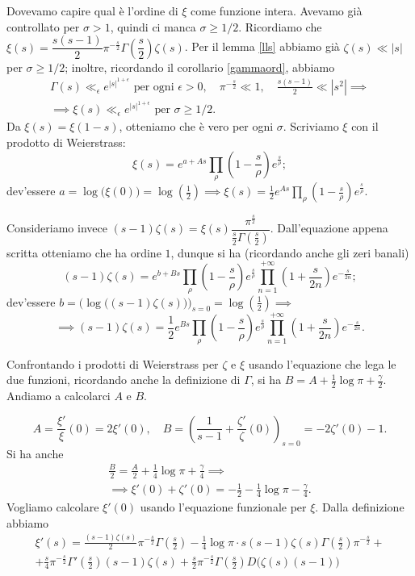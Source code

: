 Dovevamo capire qual è l'ordine di $\xi$ come funzione intera. Avevamo già controllato per $\sigma>1$, quindi ci manca $\sigma \ge 1/2$. Ricordiamo che $\xi(s)=\dfrac{s(s-1)}{2}\pi^{-\frac{s}{2}}\Gamma\left(\dfrac{s}{2}\right)\zeta(s)$. Per il lemma \ref{lls} abbiamo già $\zeta(s) \ll |s|$ per $\sigma \ge 1/2$; inoltre, ricordando il corollario \ref{gammaord}, abbiamo
\begin{gather*}
  \Gamma(s) \ll_{\epsilon} e^{|s|^{1+\epsilon}} \text{ per ogni } \epsilon>0, \quad \pi^{-\frac{s}{2}} \ll 1, \quad \frac{s(s-1)}{2} \ll |s^2| \implies \\
  \implies \xi(s) \ll_{\epsilon} e^{|s|^{1+\epsilon}} \text{ per }\sigma \ge 1/2.
\end{gather*}
Da $\xi(s)=\xi(1-s)$, otteniamo che è vero per ogni $\sigma$. Scriviamo $\xi$ con il prodotto di Weierstrass:
$$\xi(s)=e^{a+As}\prod_{\rho}\left(1-\frac{s}{\rho}\right)e^{\frac{s}{\rho}};$$
dev'essere $\displaystyle a=\log\big(\xi(0)\big)=\log\left(\frac{1}{2}\right) \implies \xi(s)=\frac{1}{2}e^{As}\prod_{\rho}\left(1-\frac{s}{\rho}\right)e^{\frac{s}{\rho}}$.

Consideriamo invece $(s-1)\zeta(s)=\xi(s)\dfrac{\pi^{\frac{s}{2}}}{\frac{s}{2}\Gamma\left(\frac{s}{2}\right)}$. Dall'equazione appena scritta otteniamo che ha ordine $1$, dunque si ha (ricordando anche gli zeri banali)
$$(s-1)\zeta(s)=e^{b+Bs}\prod_{\rho}\left(1-\frac{s}{\rho}\right)e^{\frac{s}{\rho}}\prod_{n=1}^{+\infty}\left(1+\frac{s}{2n}\right)e^{-\frac{s}{2n}};$$
dev'essere $\displaystyle b=\Bigg(\log\big((s-1)\zeta(s)\big)\Bigg)_{s=0}=\log\left(\frac{1}{2}\right) \implies$
$$\implies (s-1)\zeta(s)=\frac{1}{2}e^{Bs}\prod_{\rho}\left(1-\frac{s}{\rho}\right)e^{\frac{s}{\rho}}\prod_{n=1}^{+\infty}\left(1+\frac{s}{2n}\right)e^{-\frac{s}{2n}}.$$

Confrontando i prodotti di Weierstrass per $\zeta$ e $\xi$ usando l'equazione che lega le due funzioni, ricordando anche la definizione di $\Gamma$, si ha $B=A+\frac{1}{2}\log{\pi}+\frac{\gamma}{2}$. Andiamo a calcolarci $A$ e $B$.

$$A=\frac{\xi'}{\xi}(0)=2\xi'(0), \quad B=\left(\frac{1}{s-1}+\frac{\zeta'}{\zeta}(0)\right)_{s=0}=-2\zeta'(0)-1.$$
Si ha anche
\begin{gather*}
  \frac{B}{2}=\frac{A}{2}+\frac{1}{4}\log{\pi}+\frac{\gamma}{4} \implies \\
  \implies \xi'(0)+\zeta'(0)=-\frac{1}{2}-\frac{1}{4}\log{\pi}-\frac{\gamma}{4}.
\end{gather*}
Vogliamo calcolare $\xi'(0)$ usando l'equazione funzionale per $\xi$. Dalla definizione abbiamo
\begin{gather*}
  \xi'(s)=\frac{(s-1)\zeta(s)}{2}\pi^{-\frac{s}{2}}\Gamma\left(\frac{s}{2}\right)-\frac{1}{4}\log{\pi}\cdot s(s-1)\zeta(s)\Gamma\left(\frac{s}{2}\right)\pi^{-\frac{s}{2}}+ \\
  +\frac{s}{4}\pi^{-\frac{s}{2}}\Gamma'\left(\frac{s}{2}\right)(s-1)\zeta(s)+\frac{s}{2}\pi^{-\frac{s}{2}}\Gamma\left(\frac{s}{2}\right)D\big(\zeta(s)(s-1)\big)
\end{gather*}

